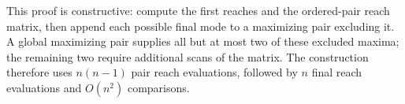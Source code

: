 This proof is constructive: compute the first reaches and the ordered-pair
reach matrix, then append each possible final mode to a maximizing pair
excluding it. A global maximizing pair supplies all but at most two of
these excluded maxima; the remaining two require additional scans of the
matrix. The construction therefore uses $n(n-1)$ pair reach evaluations,
followed by $n$ final reach evaluations and $O(n^2)$ comparisons.
